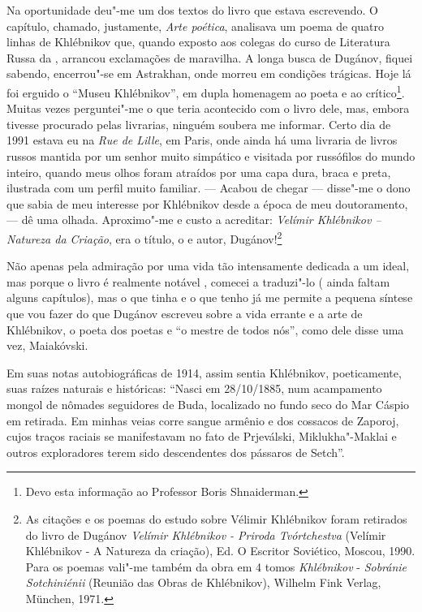 Na oportunidade deu"-me um dos textos do livro que estava escrevendo. O
capítulo, chamado, justamente, \emph{Arte poética}, analisava um poema
de quatro linhas de Khlébnikov que, quando exposto aos colegas do curso
de Literatura Russa da , arrancou exclamações de maravilha. A longa
busca de Dugánov, fiquei sabendo, encerrou"-se em Astrakhan, onde
morreu em condições trágicas. Hoje lá foi erguido o ``Museu
Khlébnikov'', em dupla homenagem ao poeta e ao crítico\footnote{Devo
  esta informação ao Professor Boris Shnaiderman.}. Muitas vezes
perguntei"-me o que teria acontecido com o livro dele, mas, embora
tivesse procurado pelas livrarias, ninguém soubera me informar. Certo
dia de 1991 estava eu na \emph{Rue de Lille}, em Paris, onde ainda há
uma livraria de livros russos mantida por um senhor muito simpático e
visitada por russófilos do mundo inteiro, quando meus olhos foram
atraídos por uma capa dura, braca e preta, ilustrada com um perfil muito
familiar. --- Acabou de chegar --- disse"-me o dono que sabia de meu
interesse por Khlébnikov desde a época de meu doutoramento, --- dê uma
olhada. Aproximo"-me e custo a acreditar: \emph{Velímir Khlébnikov -- Natureza da Criação}, era o título, o e autor, 
Dugánov!\footnote{As citações e os poemas do estudo sobre Vélimir
  Khlébnikov foram retirados do livro de  Dugánov \emph{Velímir
  Khlébnikov - Priroda Tvórtchestva} (Velímir Khlébnikov - A Natureza da
  criação), Ed. O Escritor Soviético, Moscou, 1990. Para os poemas
  vali"-me também da obra em 4 tomos \emph{ Khlébnikov} -
  \emph{Sobránie Sotchiniénii} (Reunião das Obras de  Khlébnikov),
  Wilhelm Fink Verlag, München, 1971.}

Não apenas pela admiração por uma vida tão intensamente dedicada a um
ideal, mas porque o livro é realmente notável , comecei a traduzi"-lo (
ainda faltam alguns capítulos), mas o que tinha e o que tenho já me
permite a pequena síntese que vou fazer do que Dugánov escreveu sobre a
vida errante e a arte de Khlébnikov, o poeta dos poetas e ``o mestre de
todos nós'', como dele disse uma vez, Maiakóvski.

Em suas notas autobiográficas de 1914, assim sentia Khlébnikov,
poeticamente, suas raízes naturais e históricas: ``Nasci em 28/10/1885,
num acampamento mongol de nômades seguidores de Buda, localizado no
fundo seco do Mar Cáspio em retirada. Em minhas veias corre sangue
armênio e dos cossacos de Zaporoj, cujos traços raciais se manifestavam
no fato de Prjeválski, Miklukha"-Maklai e outros exploradores terem sido
descendentes dos pássaros de Setch''.

